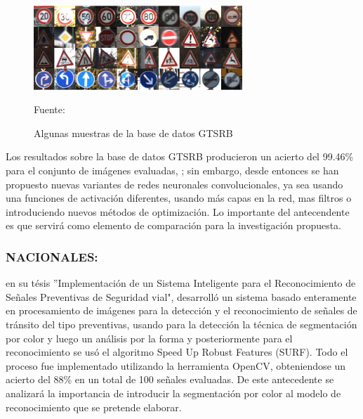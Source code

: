 		\begin{figure}[H]
		\begin{center}
		\includegraphics[width=0.7\textwidth]{images/intro/GTSRB}
		\end{center}
		\begin{center}
		\caption{\small{Algunas muestras de la base de datos GTSRB }}
		{\small{Fuente: \cite{Stallkamp2012}}}
		\end{center}
		\vspace{-1.5em}
		\end{figure}

		Los resultados sobre la base de datos GTSRB producieron un acierto del 99.46\% para el conjunto de imágenes evaluadas, \citep{Stallkamp2012}; sin embargo, desde entonces se han propuesto nuevas variantes de redes neuronales convolucionales, ya sea usando una funciones de activación diferentes, usando más capas en la red, mas filtros o introduciendo nuevos métodos de optimización. Lo importante del antecendente es que servirá como elemento de comparación para la investigación propuesta. 


	\newpage		
	\subsubsection
	{NACIONALES:}

		\citep{Vargas2015} en su tésis ”Implementación de un Sistema Inteligente para el Reconocimiento de Señales Preventivas de Seguridad vial", desarrolló un sistema basado enteramente en procesamiento de imágenes para la detección y el reconocimiento de señales de tránsito del tipo preventivas, usando para la detección la técnica de segmentación por color y luego un análisis por la forma y posteriormente para el reconocimiento se usó el algoritmo Speed Up Robust Features (SURF). Todo el proceso fue implementado utilizando la herramienta OpenCV, obteniendose un acierto del 88\% en un total de 100 señales evaluadas. De este antecedente se analizará la importancia de introducir la segmentación por color al modelo de reconocimiento que se pretende elaborar.
		\vskip 0.4cm

